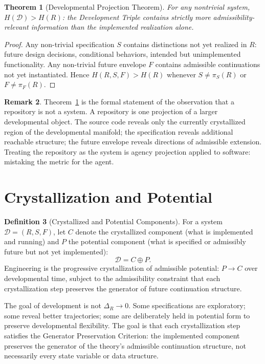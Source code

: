 \documentclass[12pt, oneside]{book}
\theoremstyle{flyxion}
\newtheorem{theorem}{Theorem}[chapter]
\theoremstyle{definition}
\newtheorem{definition}[theorem]{Definition}
\newtheorem{remark}[theorem]{Remark}
\begin{document}
\begin{theorem}[Developmental Projection Theorem]
\label{thm:dev_projection}
For any nontrivial system, $H(\mathcal{D}) > H(R)$:
the Development Triple contains strictly more
admissibility-relevant information than the
implemented realization alone.
\end{theorem}

\begin{proof}
Any non-trivial specification $S$ contains
distinctions not yet realized in $R$: future design
decisions, conditional behaviors, intended but
unimplemented functionality. Any non-trivial future
envelope $F$ contains admissible continuations not
yet instantiated. Hence $H(R,S,F) > H(R)$ whenever
$S \neq \pi_S(R)$ or $F \neq \pi_F(R)$.
\end{proof}

\begin{remark}
Theorem~\ref{thm:dev_projection} is the formal
statement of the observation that a repository is not
a system. A repository is one projection of a larger
developmental object. The source code reveals only
the currently crystallized region of the developmental
manifold; the specification reveals additional
reachable structure; the future envelope reveals
directions of admissible extension. Treating the
repository as the system is agency projection applied
to software: mistaking the metric for the agent.
\end{remark}

\section{Crystallization and Potential}

\begin{definition}[Crystallized and Potential Components]
For a system $\mathcal{D} = (R, S, F)$, let $C$ denote
the crystallized component (what is implemented and
running) and $P$ the potential component (what is
specified or admissibly future but not yet
implemented):
\[
\mathcal{D} = C \oplus P.
\]
Engineering is the progressive crystallization of
admissible potential: $P \to C$ over developmental
time, subject to the admissibility constraint that
each crystallization step preserves the generator
of future continuation structure.
\end{definition}

The goal of development is not $\Delta_R \to 0$. Some
specifications are exploratory; some reveal better
trajectories; some are deliberately held in potential
form to preserve developmental flexibility. The goal
is that each crystallization step satisfies the
Generator Preservation Criterion: the implemented
component preserves the generator of the theory's
admissible continuation structure, not necessarily
every state variable or data structure.
\end{document}

